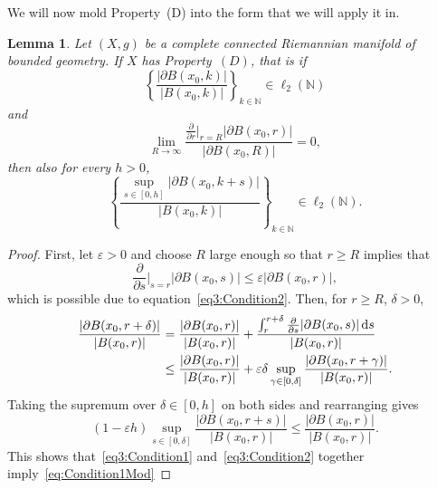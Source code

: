 \documentclass[pdftex]{sigma}
\numberwithin{equation}{section}
\newtheorem{Lemma}[Theorem]{Lemma}
\newcommand{\abs}[1]{\lvert#1\rvert}
\begin{document}
We will now mold Property~(D) into the form that we will apply it in.
\begin{Lemma}\label{L:NewPropD}
Let $(X,g)$ be a complete connected Riemannian manifold of bounded geometry. If $X$ has Property~$(D)$, that is if
\begin{equation}\label{eq3:Condition1}
\left \{ \frac{\abs{\partial B(x_0, k)}}{\abs{B(x_0,k)}}\right\}_{k\in \mathbb{N}} \in \ell_2(\mathbb{N})
\end{equation}
and
\begin{equation}\label{eq3:Condition2}
 \lim_{R\to \infty} \frac{\frac{\partial}{\partial r}\big |_{r=R} |\partial B(x_0, r)|}{|\partial B(x_0,R)|} = 0,
\end{equation}
then also for every $h > 0$,
\begin{equation}
 \label{eq:Condition1Mod}
\left \{ \frac{\sup_{s \in [0, h]}\abs{\partial B(x_0, k+s)}}{\abs{B(x_0,k)}}\right\}_{k\in \mathbb{N}} \in \ell_2(\mathbb{N}).
\end{equation}
\end{Lemma}
\begin{proof}
 First, let $\varepsilon >0$ and choose $R$ large enough so that $r \geq R$ implies that
 \[
 \frac{\partial}{\partial s}\bigg|_{s=r} |\partial B(x_0, s)| \leq \varepsilon|\partial B(x_0, r)|,
 \]
 which is possible due to equation~\eqref{eq3:Condition2}. Then, for $r \geq R$, $\delta > 0$,
 \begin{align*}
 \frac{|\partial B(x_0, r + \delta)|}{|B(x_0, r)|} &= \frac{|\partial B(x_0, r)|}{|B(x_0, r)|} + \frac{\int_r^{r+\delta} \frac{\partial}{\partial s} |\partial B(x_0, s)| \,{\rm d}s}{|B(x_0,r)|}\\
 &\leq \frac{|\partial B(x_0, r)|}{|B(x_0, r)|} + \varepsilon \delta \sup_{\gamma \in [0,\delta]}\frac{ |\partial B(x_0, r+\gamma)| }{|B(x_0,r)|}.
 \end{align*}
 Taking the supremum over $\delta \in [0, h]$ on both sides and rearranging gives
 \[
 (1-\varepsilon h) \sup_{s \in [0,\delta]}\frac{ |\partial B(x_0, r+s)| }{|B(x_0,r)|} \leq \frac{|\partial B(x_0, r)|}{|B(x_0, r)|}.
 \]
 This shows that~\eqref{eq3:Condition1} and~\eqref{eq3:Condition2} together imply~\eqref{eq:Condition1Mod}
\end{proof}
\end{document}
